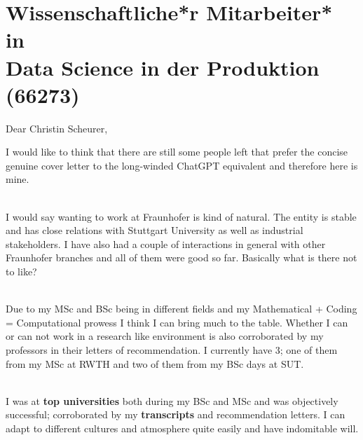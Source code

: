\section{Wissenschaftliche*r Mitarbeiter*\\ in \\Data Science in der Produktion (66273)}
Dear Christin Scheurer,

I would like to think that there are still some people left that prefer the concise genuine cover letter to the long-winded ChatGPT equivalent and therefore here is mine.

\\
I would say wanting to work at Fraunhofer is kind of natural. The entity 
is stable and has close relations with Stuttgart University as well as industrial stakeholders. 
I have also had a couple of interactions in general with other Fraunhofer branches and all of them were good so far. Basically what is there not to like?

\\
Due to my MSc and BSc being in different fields and my Mathematical + Coding = Computational prowess I think I can bring much to the table. 
Whether I can or can not work in a research like environment is also corroborated by my professors in their letters of recommendation. 
I currently have 3; one of them from my MSc at RWTH and two of them from my BSc days at SUT.

\\
I was at \textbf{top universities} both during my BSc and MSc and was objectively successful; corroborated by my \textbf{transcripts} and recommendation letters. I can adapt to different cultures and atmosphere quite easily and have indomitable will.
